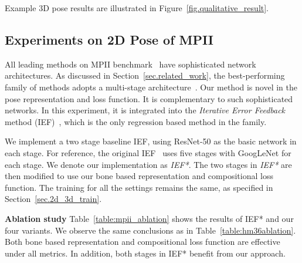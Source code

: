 \documentclass[10pt,twocolumn,letterpaper]{article}
\begin{document}
Example 3D pose results are illustrated in Figure~\ref{fig.qualitative_result}.


\subsection{Experiments on 2D Pose of MPII}

All leading methods on MPII benchmark~\cite{mpiiwebpage} have sophisticated network architectures. As discussed in Section~\ref{sec.related_work}, the best-performing family of methods adopts a multi-stage architecture~\cite{chu2017multi, carreira2016human, newell2016stacked, bulat2016human, wei2016convolutional, insafutdinov2016deepercut, gkioxari2016chained}. Our method is novel in the pose representation and loss function. It is complementary to such sophisticated networks. In this experiment, it is integrated into the \emph{Iterative Error Feedback} method (IEF)~\cite{carreira2016human}, which is the only regression based method in the family.

We implement a two stage baseline IEF, using ResNet-50 as the basic network in each stage. For reference, the original IEF~\cite{carreira2016human} uses five stages with GoogLeNet for each stage. We denote our implementation as \emph{IEF*}. The two stages in \emph{IEF*} are then modified to use our bone based representation and compositional loss function. The training for all the settings remains the same, as specified in Section~\ref{sec.2d_3d_train}.

\textbf{Ablation study} Table~\ref{table:mpii_ablation} shows the results of IEF* and our four variants. We observe the same conclusions as in Table~\ref{table:hm36ablation}. Both bone based representation and compositional loss function are effective under all metrics. In addition, both stages in IEF* benefit from our approach.

\begin{comment}
\textbf{Comparison with the state-of-the-art} Table~\ref{table:mpii_comparison_IEF} compares the per-joint accuracy of the original IEF~\cite{carreira2016human}, IEF* and our method. It shows that: 1) IEF* is better than~\cite{carreira2016human}, therefore serving as a valid baseline; 2) our method produces significant improvement over the baseline.

Table~\ref{table:mpii_comparison} reports the results of all leading methods on MPII benchmark~\cite{mpiiwebpage}. Ours ($86.4\%$) is the best regression based method. It is competitive to other detection based methods.
\end{comment}
\end{document}
